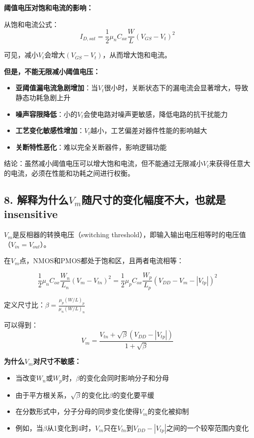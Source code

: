 \documentclass[UTF8,12pt,a4paper]{ctexart}
\begin{document}
\textbf{阈值电压对饱和电流的影响：}

从饱和电流公式：
\begin{equation}
I_{D,sat} = \frac{1}{2} \mu_n C_{ox} \frac{W}{L} (V_{GS} - V_t)^2
\end{equation}

可见，减小$V_t$会增大$(V_{GS} - V_t)$，从而增大饱和电流。

\textbf{但是，不能无限减小阈值电压：}

\begin{itemize}
    \item \textbf{亚阈值漏电流急剧增加}：当$V_t$很小时，关断状态下的漏电流会显著增大，导致静态功耗急剧上升
    \item \textbf{噪声容限降低}：小的$V_t$会使电路对噪声更敏感，降低电路的抗干扰能力
    \item \textbf{工艺变化敏感性增加}：$V_t$越小，工艺偏差对器件性能的影响越大
    \item \textbf{关断特性恶化}：难以完全关断器件，影响逻辑功能
\end{itemize}

结论：虽然减小阈值电压可以增大饱和电流，但不能通过无限减小$V_t$来获得任意大的电流，必须在性能和功耗之间进行权衡。

\subsection*{8. 解释为什么$V_m$随尺寸的变化幅度不大，也就是insensitive}

$V_m$是反相器的转换电压（switching threshold），即输入输出电压相等时的电压值（$V_{in} = V_{out}$）。

在$V_m$点，NMOS和PMOS都处于饱和区，且两者电流相等：

\begin{equation}
\frac{1}{2} \mu_n C_{ox} \frac{W_n}{L_n} (V_m - V_{tn})^2 = \frac{1}{2} \mu_p C_{ox} \frac{W_p}{L_p} (V_{DD} - V_m - |V_{tp}|)^2
\end{equation}

定义尺寸比：$\beta = \frac{\mu_p (W/L)_p}{\mu_n (W/L)_n}$

可以得到：
\begin{equation}
V_m = \frac{V_{tn} + \sqrt{\beta}(V_{DD} - |V_{tp}|)}{1 + \sqrt{\beta}}
\end{equation}

\textbf{为什么$V_m$对尺寸不敏感：}

\begin{itemize}
    \item 当改变$W_n$或$W_p$时，$\beta$的变化会同时影响分子和分母
    \item 由于平方根关系，$\sqrt{\beta}$的变化比$\beta$的变化要平缓
    \item 在分数形式中，分子分母的同步变化使得$V_m$的变化被抑制
    \item 例如，当$\beta$从1变化到4时，$V_m$只在$V_{tn}$到$V_{DD} - |V_{tp}|$之间的一个较窄范围内变化
\end{itemize}
\end{document}
